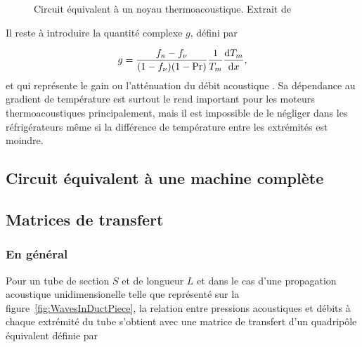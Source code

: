 \begin{figure}[!ht]
    \centering
    
    \caption{Circuit équivalent à un noyau thermoacoustique. Extrait de \cite{swift_thermoacoustics_2017}}
    \label{fig:CircEquivTAC}
\end{figure}

Il reste à introduire la quantité complexe $g$, défini par 

\begin{equation}
    g = \frac{f_\kappa - f_\nu}{(1-f_\nu)(1-\mathrm{Pr})}\frac{1}{T_m}\frac{\mathrm{d} T_m}{\mathrm{d} x},
    \label{eq:GainNoyauTA_Swift}
\end{equation}
et qui représente le gain ou l'atténuation du débit acoustique \cite{swift_thermoacoustics_2017}. Sa dépendance au gradient de température est surtout le rend important pour les moteurs thermoacoustiques principalement, mais il est impossible de le négliger dans les réfrigérateurs même si la différence de température entre les extrémités est moindre.

\subsection{Circuit équivalent à une machine complète}

\subsection{Matrices de transfert}
\subsubsection{En général}
Pour un tube de section $S$ et de longueur $L$ et dans le cas d'une propagation acoustique unidimensionelle telle que représenté sur la figure~\ref{fig:WavesInDuctPiece}, la relation entre pressions acoustiques et débits à chaque extrémité du tube s'obtient avec une matrice de transfert d'un quadripôle équivalent définie par  


